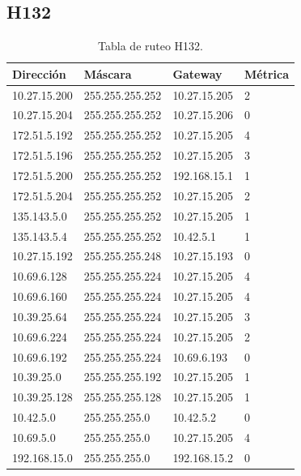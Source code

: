 \documentclass[12pt,titlepage]{article}
\begin{document}
\subsection{H132}
\begin{table}
  \begin{center}
    \begin{tabular}{|l|l|l|l|}
      \hline
        \bf{Direcci\'on} & \bf{M\'ascara} & \bf{Gateway} & \bf{M\'etrica} \\
      \hline 
	10.27.15.200  & 255.255.255.252 & 10.27.15.205 & 2 \\
        10.27.15.204  & 255.255.255.252 & 10.27.15.206 & 0 \\
        172.51.5.192  & 255.255.255.252 & 10.27.15.205 & 4 \\
        172.51.5.196  & 255.255.255.252 & 10.27.15.205 & 3 \\
        172.51.5.200  & 255.255.255.252 & 192.168.15.1 & 1 \\
        172.51.5.204  & 255.255.255.252 & 10.27.15.205 & 2 \\
        135.143.5.0   & 255.255.255.252 & 10.27.15.205 & 1 \\
        135.143.5.4   & 255.255.255.252 & 10.42.5.1 & 1 \\ 	
	10.27.15.192  & 255.255.255.248 & 10.27.15.193 & 0 \\
	10.69.6.128   & 255.255.255.224 & 10.27.15.205 & 4 \\
        10.69.6.160   & 255.255.255.224 & 10.27.15.205 & 4 \\
	10.39.25.64   & 255.255.255.224 & 10.27.15.205 & 3 \\       
	10.69.6.224   & 255.255.255.224 & 10.27.15.205 & 2 \\
	10.69.6.192   & 255.255.255.224 & 10.69.6.193 & 0 \\	
	10.39.25.0    & 255.255.255.192 & 10.27.15.205 & 1 \\
	10.39.25.128  & 255.255.255.128 & 10.27.15.205 & 1 \\
	10.42.5.0     & 255.255.255.0 & 10.42.5.2 & 0 \\
        10.69.5.0     & 255.255.255.0 & 10.27.15.205 & 4 \\
        192.168.15.0  & 255.255.255.0 & 192.168.15.2 & 0 \\  
    \hline
    \end{tabular} \\
  \end{center}
  \caption{Tabla de ruteo H132.}
\end{table}
\FloatBarrier
\end{document}

